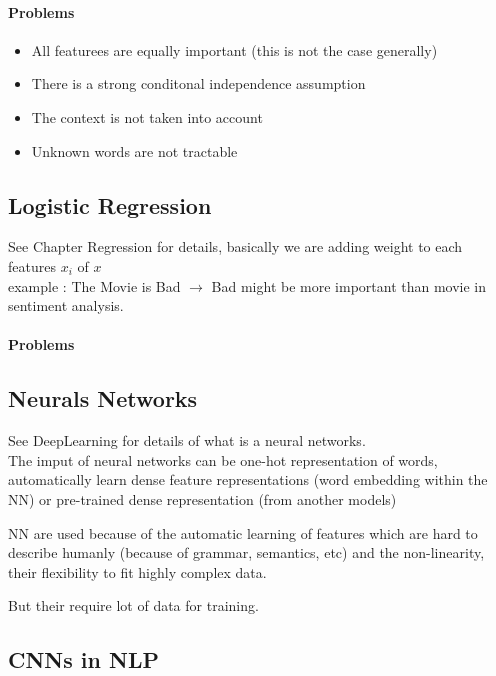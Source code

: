 			\paragraph*{Problems}

				\begin{itemize}
					\item All featurees are equally important (this is not the case generally)
					\item There is a strong conditonal independence assumption
					\item The context is not taken into account
					\item Unknown words are not tractable
				\end{itemize}

		\subsection{Logistic Regression}
			See Chapter Regression for details, basically we are adding weight to each features $x_i$ of $x$ \\
			example : The Movie is Bad $\rightarrow$ Bad might be more important than movie in sentiment analysis.

			\paragraph*{Problems}
				
		\subsection{Neurals Networks}
			See DeepLearning for details of what is a neural networks. \\

			The imput of neural networks can be one-hot representation of words, automatically learn dense feature representations (word embedding within the NN) or pre-trained dense representation (from another models)

			NN are used because of the automatic learning of features which are hard to describe humanly (because of grammar, semantics, etc) and the non-linearity, their flexibility to fit highly complex data. 

			But their require lot of data for training. 


		\subsection{CNNs in NLP}

